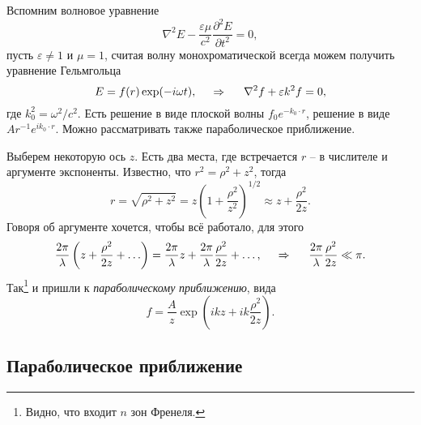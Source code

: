 Вспомним волновое уравнение
\begin{equation*}
    \nabla^2 E - \frac{\varepsilon \mu}{c^2} \frac{\partial^2 E}{\partial t^2} = 0,
\end{equation*}
пусть $\varepsilon \neq 1$ и $\mu=1$, считая волну монохроматической всегда можем получить уравнение Гельмгольца
\begin{equation*}
    E = f(r) \exp(-i \omega t),
    \hspace{0.5cm} \Rightarrow \hspace{0.5cm}
    \nabla^2 f + \varepsilon k^2 f = 0,
\end{equation*}
где $k_0^2 = \omega^2/c^2$. Есть решение в виде плоской волны $f_0 e^{- k_0 \cdot r}$, решение в виде $A r^{-1} e^{i k_0 \cdot r}$. Можно рассматривать также параболическое приближение. 

Выберем некоторую ось $z$. Есть два места, где встречается $r$ -- в числителе и аргументе экспоненты. Известно, что $r^2 = \rho^2 + z^2$, тогда
\begin{equation*}
    r = \sqrt{\rho^2 + z^2} = z \left(1 + \frac{\rho^2}{z^2}\right)^{1/2} \approx z + \frac{\rho^2}{2z}.
\end{equation*}
Говоря об аргументе хочется, чтобы всё работало, для этого
\begin{equation*}
    \frac{2\pi}{\lambda} \left(z + \frac{\rho^2}{2z}+\ldots\right) = \frac{2\pi}{\lambda} z + \frac{2\pi}{\lambda} \frac{\rho^2}{2z} + \ldots,
    \hspace{0.5cm} \Rightarrow \hspace{0.5cm}
    \frac{2\pi}{\lambda} \frac{\rho^2}{2z} \ll \pi.
\end{equation*}
Так\footnote{
    Видно, что входит $n$ зон Френеля.
}  и пришли к \textit{параболическому} \textit{приближению}, вида
\begin{equation*}
    f = \frac{A}{z} \exp\left(
        i k z + i k \frac{\rho^2}{2z}
    \right).
\end{equation*}


\subsection{Параболическое приближение}

